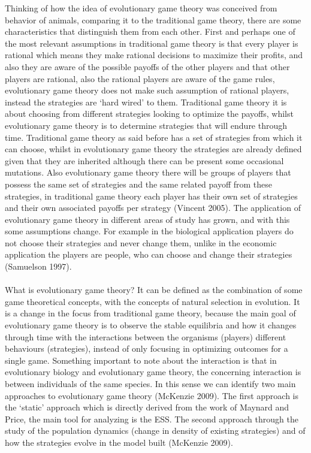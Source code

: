 \documentclass{article}
\begin{document}
Thinking of how the idea of evolutionary game theory was conceived from behavior of animals, comparing it to the traditional game theory, there are some characteristics that distinguish them from each other. First and perhaps one of the most relevant assumptions in traditional game theory is that every player is rational which means they make rational decisions to maximize their profits, and also they are aware of the possible payoffs of the other players and that other players are rational, also the rational players are aware of the game rules, evolutionary game theory does not make such assumption of rational players, instead the strategies are ‘hard wired’ to them.  Traditional game theory it is about choosing from different strategies looking to optimize the payoffs, whilst evolutionary game theory is to determine strategies that will endure through time. Traditional game theory as said before has a set of strategies from which it can choose, whilst in evolutionary game theory the strategies are already defined given that they are inherited although there can be present some occasional mutations. Also evolutionary game theory there will be groups of players that possess the same set of strategies and the same related payoff from these strategies, in traditional game theory each player has their own set of strategies and their own associated payoffs per strategy (Vincent 2005).  The application of evolutionary game theory in different areas of study has grown, and with this some assumptions change. For example in the biological application players do not choose their strategies and never change them, unlike in the economic application the players are people, who can choose and change their strategies (Samuelson 1997).
\\\\What is evolutionary game theory?
It can be defined as the combination of some game theoretical concepts, with the concepts of natural selection in evolution. It is a change in the focus from traditional game theory, because the main goal of evolutionary game theory is to observe the stable equilibria and how it changes through time with the interactions between the organisms (players) different behaviours (strategies), instead of only focusing in optimizing outcomes for a single game. Something important to note about the interaction is that in evolutionary biology and evolutionary game theory, the concerning interaction is between individuals of the same species. In this sense we can identify two main approaches to evolutionary game theory (McKenzie 2009). The first approach is the ‘static’ approach which is directly derived from the work of Maynard and Price, the main tool for analyzing is the ESS. The second approach through the study of the population dynamics (change in density of existing strategies) and of how the strategies evolve in the model built (McKenzie 2009).
\end{document}
